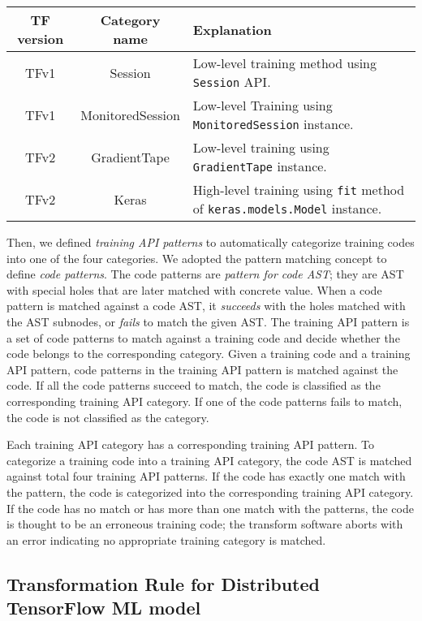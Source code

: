\begin{center}
  \begin{tabular}{|c|c|l|}
  \hline
  TF version & Category name & Explanation \\ 
  \hline
  TFv1 & Session & Low-level training method using {\tt Session} API. \\
  \hline
  TFv1 & MonitoredSession & Low-level Training using {\tt MonitoredSession} instance. \\
  \hline
  TFv2 & GradientTape & Low-level training using {\tt GradientTape} instance. \\
  \hline
  TFv2 & Keras & High-level training using {\tt fit} method of {\tt keras.models.Model} instance. \\
  \hline
\end{tabular}
\end{center}

Then, we defined \textit{training API patterns} to automatically
categorize training codes into one of the four categories.
We adopted the pattern matching concept to define \textit{code patterns}.
The code patterns are \textit{pattern for code AST}; they are AST with
special holes that are later matched with concrete value.
When a code pattern is matched against a code AST,
it \textit{succeeds} with the holes matched with the AST subnodes,
or \textit{fails} to match the given AST.
The training API pattern is a set of code patterns
to match against a training code and decide whether the code belongs to
the corresponding category.
Given a training code and a training API pattern,
code patterns in the training API pattern is matched against the code. 
If all the code patterns succeed to match, the code is classified as 
the corresponding training API category.
If one of the code patterns fails to match, the code is not classified
as the category.

Each training API category has a corresponding training API pattern.
To categorize a training code into a training API category,
the code AST is matched against total four training API patterns.
If the code has exactly one match with the pattern,
the code is categorized into the corresponding training API category.
If the code has no match or has more than one match with the patterns, 
the code is thought to be an erroneous training code; 
the transform software aborts with an error indicating
no appropriate training category is matched.

\subsection{Transformation Rule for Distributed TensorFlow ML model}

